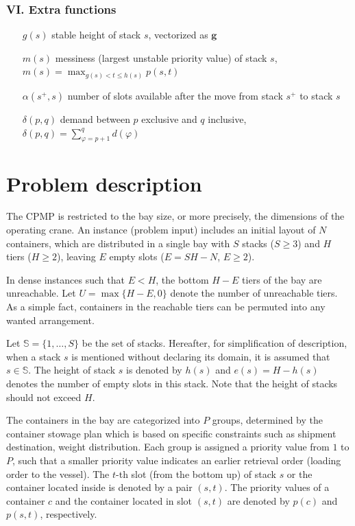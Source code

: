 \documentclass[review,3p,times,12pt,number]{elsarticle}\usepackage{amsmath}\usepackage{amssymb}
\begin{document}
\subsubsection*{VI\@. Extra functions}
\begin{enumerate}[noitemsep, align=LabelCenter,labelwidth=\mylongest,leftmargin=!]
\item[$g(s)$] stable height of stack $s$, vectorized as $\boldsymbol{ g}$
\item[$m(s)$] messiness (largest unstable priority value) of stack $s$, $m(s)=\max_{ g(s)<t\le h(s)}p(s,t)$
\item[$\alpha(s^+,s)$] number of slots available after the move from stack $s^+$ to stack $s$
\item[$\delta(p,q)$] demand between $p$ exclusive and $q$ inclusive, $\delta(p,q)=\sum_{\varphi=p+1}^{q}d(\varphi)$
\end{enumerate}


\section{Problem description}
\label{sec:problem}

The CPMP is restricted to the bay size, or more precisely, the dimensions of the operating crane. An instance (problem input) includes an initial layout of $N$ containers, which are distributed in a single bay with $S$ stacks ($S\ge 3$) and $H$ tiers ($H\ge 2$), leaving $E$ empty slots ($E=SH-N$, $E\ge 2$).



In dense instances such that $E<H$, the bottom $H-E$ tiers of the bay are unreachable. Let $U=\max\{H-E,0\}$ denote the number of unreachable tiers. As a simple fact, containers in the reachable tiers can be permuted into any wanted arrangement.

Let $\mathbb{S}=\{1,\dots,S\}$ be the set of stacks. Hereafter, for simplification of description, when a stack $s$ is mentioned without declaring its domain, it is assumed that $s\in\mathbb{S}$. The height of stack $s$ is denoted by $h(s)$ and $e(s)=H-h(s)$ denotes the number of empty slots in this stack. Note that the height of stacks should not exceed $H$.

The containers in the bay are categorized into $P$ groups, determined by the container stowage plan which is based on specific constraints such as shipment destination, weight distribution. Each group is assigned a priority value from $1$ to $P$, such that a smaller priority value indicates an earlier retrieval order (loading order to the vessel). The $t$-th slot (from the bottom up) of stack $s$ or the container located inside is denoted by a pair $(s,t)$.
The priority values of a container $c$ and the container located in slot $(s,t)$ are denoted by $p(c)$ and $p(s,t)$, respectively.
\end{document}
